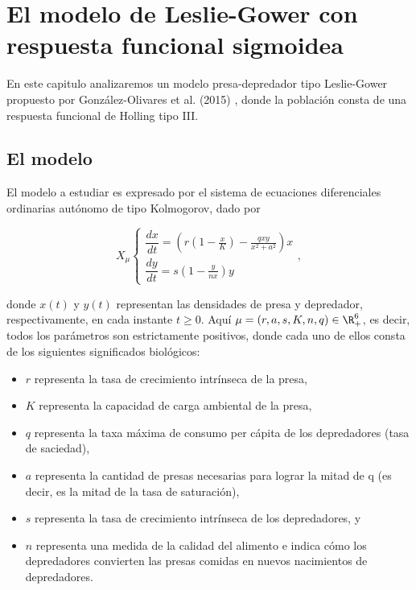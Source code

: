 {\chapter{El modelo de Leslie-Gower con respuesta funcional sigmoidea}
	En este capitulo analizaremos un modelo presa-depredador tipo Leslie-Gower propuesto por González-Olivares et al. (2015) \cite{articulo}, donde la población consta de una respuesta funcional de Holling tipo III.
	
	\section{El modelo}
	El modelo a estudiar es expresado por el sistema de ecuaciones diferenciales ordinarias	 autónomo de tipo Kolmogorov, dado por
	
	\begin{equation}
		X_{\mu}
		\begin{cases} 
			\dfrac{dx}{dt} = (r \left(1 - \frac{x}{K}\right) - \frac{q x y}{x^2 + a^2})x \\ 
			\dfrac{dy}{dt} = s \left(1 - \frac{y}{n x}\right) y
		\end{cases},
		\label{eq: modelo1}
	\end{equation}
	
	donde $x(t)$ y $y(t)$ representan las densidades de presa y depredador, respectivamente, en cada instante $t \geq 0$. Aquí $\mu = (r, a, s, K, n, q) \in \R^{6}_{+}$, es decir, todos los parámetros son estrictamente positivos, donde cada uno de ellos consta de los siguientes significados biológicos:
	
	\begin{itemize}
		\item $r$ representa la tasa de crecimiento intrínseca de la presa,
		\item $K$ representa la capacidad de carga ambiental de la presa,
		\item $q$ representa la taxa máxima de consumo per cápita de los depredadores (tasa de saciedad),
		\item $a$ representa la cantidad de presas necesarias para lograr la mitad de
		q (es decir, es la mitad de la tasa de saturación),
		\item $s$ representa la tasa de crecimiento intrínseca de los depredadores, y
		\item $n$ representa una medida de la calidad del alimento e indica cómo los depredadores convierten las presas comidas en nuevos nacimientos de depredadores.
	\end{itemize}
	
}
